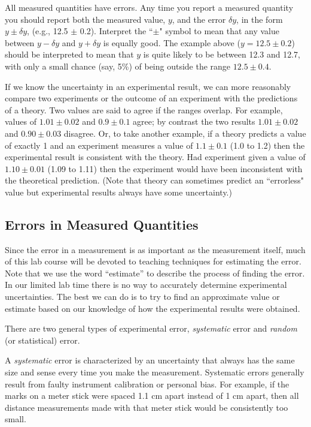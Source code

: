     All measured quantities have
errors.  Any time you report a measured quantity you should report
both the measured value, $y$, and the error $\delta y$, in the form
$y \pm \delta y$,
(e.g., 12.5 $\pm$ 0.2).  Interpret the ``$\pm$" symbol to mean that any
value between $y - \delta y$ and $y + \delta y$ is equally good.  The example
above ($y= 12.5 \pm 0.2$) should be interpreted to
mean that $y$ is quite likely to be between 12.3 and 12.7, with only
a small chance (say, 5\%) of being outside the range $12.5 \pm 0.4$.

     If we know the uncertainty in an experimental result, we can
more reasonably compare two experiments or the outcome of an
experiment with the predictions of a theory.  Two values are said
to agree if the ranges overlap.
For example, values of $1.01 \pm 0.02$ and
$0.9 \pm 0.1$ agree; by contrast the two results $1.01 \pm 0.02$ and
$0.90 \pm 0.03$ disagree.  Or, to take another example, if a theory
predicts a value of exactly 1 and an experiment measures a value of $1.1 \pm 0.1$
(1.0 to 1.2) then the experimental result is consistent with the
theory.  Had experiment given a value of $1.10 \pm 0.01$ (1.09 to
1.11) then the experiment would have been inconsistent with the
theoretical prediction.  (Note that theory can sometimes
predict an ``errorless" value but experimental results always have
some uncertainty.)

\subsection*{Errors in Measured Quantities}

     Since the error in a measurement is as important as
the measurement itself, much of this lab course will be devoted to
teaching techniques for estimating the
error.  Note that we use the word ``estimate'' to describe the process of
finding the error. In our limited lab time there is no 
way to accurately determine experimental uncertainties.  The best we can
do is to try to find an approximate value or estimate based on our
knowledge of how the experimental results were obtained.

     There are two general types of experimental error,
{\em systematic} error and {\em random} (or statistical) error.

     A {\em systematic} error is characterized by an uncertainty that
always has the same size and sense every time you make the
measurement.  Systematic errors generally result from faulty
instrument calibration or personal bias.  For example, if the
marks on a meter stick were spaced 1.1 cm apart instead of
1 cm apart, then all distance measurements made with that meter
stick would be consistently too small.

